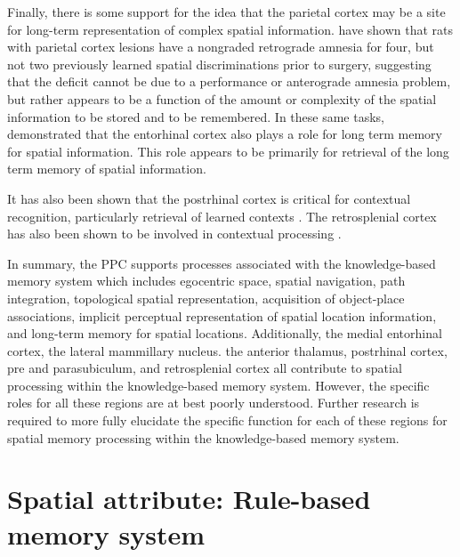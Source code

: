 \documentclass[doc, longtable]{apa6}
\begin{document}
Finally, there is some support for the idea that the parietal cortex may be a site for long-term representation of complex spatial information. \textcite{Cho1995c, Cho1996a}  have shown that rats with parietal cortex lesions have a nongraded retrograde amnesia for four, but not two previously learned spatial discriminations prior to surgery, suggesting that the deficit cannot be due to a performance or anterograde amnesia problem, but rather appears to be a function of the amount or complexity of the spatial information to be stored and to be remembered. In these same tasks, \textcite{Cho1996a} demonstrated that the entorhinal cortex also plays a role for long term memory for spatial information. This role appears to be primarily for retrieval of the long term memory of spatial information.
	
It has also been shown that the postrhinal cortex is critical for contextual recognition, particularly retrieval of learned contexts \parencite{Bucci2000b, Bucci2002b, Burwell2003a, Burwell2004b, Burwell2004c}. The retrosplenial cortex has also been shown to be involved in contextual processing \parencite{Keene2008a}.
	
In summary, the PPC supports processes associated with the knowledge-based memory system which includes egocentric space, spatial navigation, path integration, topological spatial representation, acquisition of object-place associations, implicit perceptual representation of spatial location information, and long-term memory for spatial locations. Additionally, the medial entorhinal cortex, the lateral mammillary nucleus. the anterior thalamus, postrhinal cortex, pre and parasubiculum, and retrosplenial cortex all contribute to spatial processing within the knowledge-based memory system. However, the specific roles for all these regions are at best poorly understood. Further research is required to more fully elucidate the specific function for each of these regions for spatial memory processing within the knowledge-based memory system.

\section{Spatial attribute: Rule-based memory system}
\end{document}
